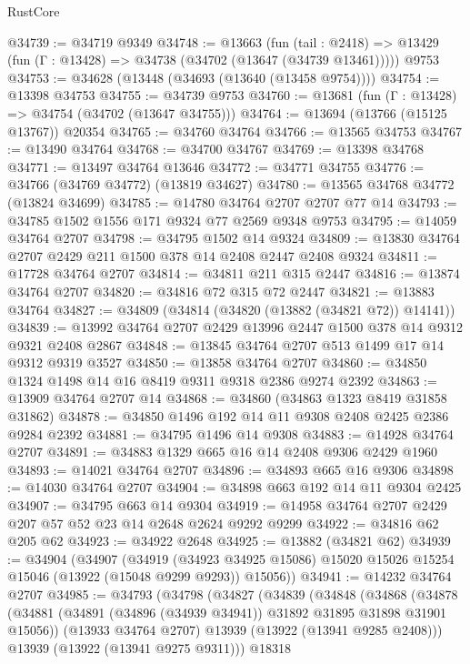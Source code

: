 \begin{lexlean}{RustCore}
\begin{coremodule}
@34739 := @34719 @9349
@34748 := @13663
    (fun (tail : @2418) => @13429 (fun (Γ : @13428) => @34738 (@34702 (@13647 (@34739 @13461)))))
    @9753
@34753 := @34628 (@13448 (@34693 (@13640 (@13458 @9754))))
@34754 := @13398 @34753
@34755 := @34739 @9753
@34760 := @13681 (fun (Γ : @13428) => @34754 (@34702 (@13647 @34755)))
@34764 := @13694 (@13766 (@15125 @13767)) @20354
@34765 := @34760 @34764
@34766 := @13565 @34753
@34767 := @13490 @34764
@34768 := @34700 @34767
@34769 := @13398 @34768
@34771 := @13497 @34764 @13646
@34772 := @34771 @34755
@34776 := @34766 (@34769 @34772) (@13819 @34627)
@34780 := @13565 @34768 @34772 (@13824 @34699)
@34785 := @14780 @34764 @2707 @2707 @77 @14
@34793 := @34785 @1502 @1556 @171 @9324 @77 @2569 @9348 @9753
@34795 := @14059 @34764 @2707
@34798 := @34795 @1502 @14 @9324
@34809 := @13830 @34764 @2707 @2429 @211 @1500 @378 @14 @2408 @2447 @2408 @9324
@34811 := @17728 @34764 @2707
@34814 := @34811 @211 @315 @2447
@34816 := @13874 @34764 @2707
@34820 := @34816 @72 @315 @72 @2447
@34821 := @13883 @34764
@34827 := @34809 (@34814 (@34820 (@13882 (@34821 @72)) @14141))
@34839 := @13992 @34764 @2707 @2429 @13996 @2447 @1500 @378 @14 @9312 @9321 @2408 @2867
@34848 := @13845 @34764 @2707 @513 @1499 @17 @14 @9312 @9319 @3527
@34850 := @13858 @34764 @2707
@34860 := @34850 @1324 @1498 @14 @16 @8419 @9311 @9318 @2386 @9274 @2392
@34863 := @13909 @34764 @2707 @14
@34868 := @34860 (@34863 @1323 @8419 @31858 @31862)
@34878 := @34850 @1496 @192 @14 @11 @9308 @2408 @2425 @2386 @9284 @2392
@34881 := @34795 @1496 @14 @9308
@34883 := @14928 @34764 @2707
@34891 := @34883 @1329 @665 @16 @14 @2408 @9306 @2429 @1960
@34893 := @14021 @34764 @2707
@34896 := @34893 @665 @16 @9306
@34898 := @14030 @34764 @2707
@34904 := @34898 @663 @192 @14 @11 @9304 @2425
@34907 := @34795 @663 @14 @9304
@34919 := @14958 @34764 @2707 @2429 @207 @57 @52 @23 @14 @2648 @2624 @9292 @9299
@34922 := @34816 @62 @205 @62
@34923 := @34922 @2648
@34925 := @13882 (@34821 @62)
@34939 := @34904
    (@34907
      (@34919
        (@34923 @34925 @15086)
        @15020
        @15026
        @15254
        @15046
        (@13922 (@15048 @9299 @9293))
        @15056))
@34941 := @14232 @34764 @2707
@34985 := @34793
    (@34798
      (@34827
        (@34839
          (@34848
            (@34868
              (@34878
                (@34881 (@34891 (@34896 (@34939 @34941)) @31892 @31895 @31898 @31901 @15056))
                (@13933 @34764 @2707)
                @13939
                (@13922 (@13941 @9285 @2408)))
              @13939
              (@13922 (@13941 @9275 @9311)))
            @18318

\end{coremodule}
\end{lexlean}

